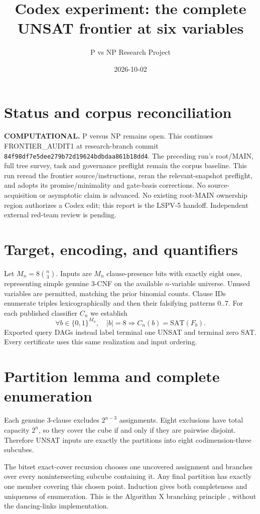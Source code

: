 \documentclass[11pt]{article}
\title{Codex experiment: the complete UNSAT frontier at six variables}
\author{P vs NP Research Project}
\date{2026-10-02}
\begin{document}
\maketitle
\section*{Status and corpus reconciliation}
\textbf{COMPUTATIONAL.} P versus NP remains open. This continues
FRONTIER\_AUDIT1 at research-branch commit
\texttt{84f98df7e5dee279b72d19624bdbdaa861b18dd4}.
The preceding run's root/MAIN, full tree survey, task and governance preflight
remain the corpus baseline. This run reread the frontier source/instructions,
reran the relevant-snapshot preflight, and adopts its promise/minimality and
gate-basis corrections. No source-acquisition or asymptotic claim is advanced.
No existing root-MAIN ownership region authorizes a Codex edit; this report is
the LSPV-5 handoff. Independent external red-team review is pending.

\section*{Target, encoding, and quantifiers}
Let $M_n=8\binom n3$. Inputs are $M_n$ clause-presence bits with exactly eight
ones, representing simple genuine 3-CNF on the available $n$-variable universe.
Unused variables are permitted, matching the prior binomial counts. Clause IDs
enumerate triples lexicographically and then their falsifying patterns $0..7$.
For each published classifier $C_n$ we establish
\[
\forall b\in\{0,1\}^{M_n},\quad |b|=8
\Longrightarrow C_n(b)=\mathrm{SAT}(F_b).
\]
Exported query DAGs instead label terminal one UNSAT and terminal zero SAT.
Every certificate uses this same realization and input ordering.

\section*{Partition lemma and complete enumeration}
Each genuine 3-clause excludes $2^{n-3}$ assignments. Eight exclusions have
total capacity $2^n$, so they cover the cube if and only if they are pairwise
disjoint. Therefore UNSAT inputs are exactly the partitions into eight
codimension-three subcubes.

The bitset exact-cover recursion chooses one uncovered assignment and branches
over every nonintersecting subcube containing it. Any final partition has
exactly one member covering this chosen point. Induction gives both completeness
and uniqueness of enumeration. This is the Algorithm X branching principle
\cite{knuth}, without the dancing-links implementation.
\end{document}
